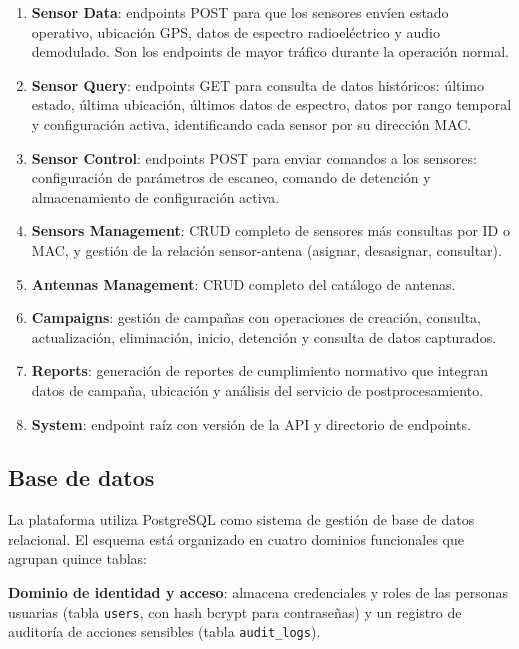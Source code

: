 \begin{enumerate}
    \item \textbf{Sensor Data}: endpoints POST para que los sensores envíen
    estado operativo, ubicación GPS, datos de espectro radioeléctrico y audio
    demodulado. Son los endpoints de mayor tráfico durante la operación normal.

    \item \textbf{Sensor Query}: endpoints GET para consulta de datos
    históricos: último estado, última ubicación, últimos datos de espectro,
    datos por rango temporal y configuración activa, identificando cada sensor
    por su dirección MAC.

    \item \textbf{Sensor Control}: endpoints POST para enviar comandos a los
    sensores: configuración de parámetros de escaneo, comando de detención y
    almacenamiento de configuración activa.

    \item \textbf{Sensors Management}: CRUD completo de sensores más consultas
    por ID o MAC, y gestión de la relación sensor-antena (asignar, desasignar,
    consultar).

    \item \textbf{Antennas Management}: CRUD completo del catálogo de antenas.

    \item \textbf{Campaigns}: gestión de campañas con operaciones de creación,
    consulta, actualización, eliminación, inicio, detención y consulta de
    datos capturados.

    \item \textbf{Reports}: generación de reportes de cumplimiento normativo
    que integran datos de campaña, ubicación y análisis del servicio de
    postprocesamiento.

    \item \textbf{System}: endpoint raíz con versión de la API y directorio de
    endpoints.
\end{enumerate}

\subsection{Base de datos}

La plataforma utiliza PostgreSQL como sistema de gestión de base de datos
relacional. El esquema está organizado en cuatro dominios funcionales que
agrupan quince tablas:

\textbf{Dominio de identidad y acceso}: almacena credenciales y roles de las
personas usuarias (tabla \texttt{users}, con hash bcrypt para contraseñas) y
un registro de auditoría de acciones sensibles (tabla \texttt{audit\_logs}).


